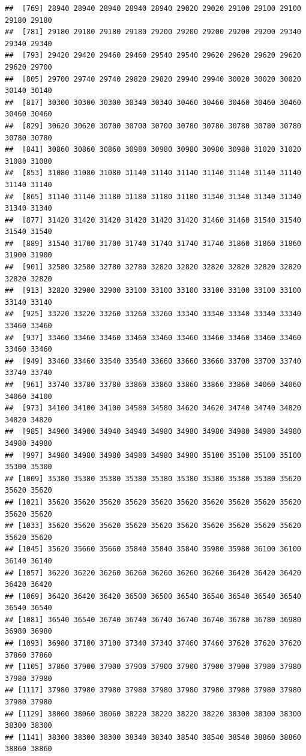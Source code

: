 \documentclass[
  12pt,
]{article}
\begin{document}
\begin{verbatim}
##  [769] 28940 28940 28940 28940 28940 29020 29020 29100 29100 29100 29180 29180
##  [781] 29180 29180 29180 29180 29200 29200 29200 29200 29200 29340 29340 29340
##  [793] 29420 29420 29460 29460 29540 29540 29620 29620 29620 29620 29620 29700
##  [805] 29700 29740 29740 29820 29820 29940 29940 30020 30020 30020 30140 30140
##  [817] 30300 30300 30300 30340 30340 30460 30460 30460 30460 30460 30460 30460
##  [829] 30620 30620 30700 30700 30700 30780 30780 30780 30780 30780 30780 30780
##  [841] 30860 30860 30860 30980 30980 30980 30980 30980 31020 31020 31080 31080
##  [853] 31080 31080 31080 31140 31140 31140 31140 31140 31140 31140 31140 31140
##  [865] 31140 31140 31180 31180 31180 31180 31340 31340 31340 31340 31340 31340
##  [877] 31420 31420 31420 31420 31420 31420 31460 31460 31540 31540 31540 31540
##  [889] 31540 31700 31700 31740 31740 31740 31740 31860 31860 31860 31900 31900
##  [901] 32580 32580 32780 32780 32820 32820 32820 32820 32820 32820 32820 32820
##  [913] 32820 32900 32900 33100 33100 33100 33100 33100 33100 33100 33140 33140
##  [925] 33220 33220 33260 33260 33260 33340 33340 33340 33340 33340 33460 33460
##  [937] 33460 33460 33460 33460 33460 33460 33460 33460 33460 33460 33460 33460
##  [949] 33460 33460 33540 33540 33660 33660 33660 33700 33700 33740 33740 33740
##  [961] 33740 33780 33780 33860 33860 33860 33860 33860 34060 34060 34060 34100
##  [973] 34100 34100 34100 34580 34580 34620 34620 34740 34740 34820 34820 34820
##  [985] 34900 34900 34940 34940 34980 34980 34980 34980 34980 34980 34980 34980
##  [997] 34980 34980 34980 34980 34980 34980 35100 35100 35100 35100 35300 35300
## [1009] 35380 35380 35380 35380 35380 35380 35380 35380 35380 35620 35620 35620
## [1021] 35620 35620 35620 35620 35620 35620 35620 35620 35620 35620 35620 35620
## [1033] 35620 35620 35620 35620 35620 35620 35620 35620 35620 35620 35620 35620
## [1045] 35620 35660 35660 35840 35840 35840 35980 35980 36100 36100 36140 36140
## [1057] 36220 36220 36260 36260 36260 36260 36260 36420 36420 36420 36420 36420
## [1069] 36420 36420 36420 36500 36500 36540 36540 36540 36540 36540 36540 36540
## [1081] 36540 36540 36740 36740 36740 36740 36740 36780 36780 36980 36980 36980
## [1093] 36980 37100 37100 37340 37340 37460 37460 37620 37620 37620 37860 37860
## [1105] 37860 37900 37900 37900 37900 37900 37900 37900 37980 37980 37980 37980
## [1117] 37980 37980 37980 37980 37980 37980 37980 37980 37980 37980 37980 37980
## [1129] 38060 38060 38060 38220 38220 38220 38220 38300 38300 38300 38300 38300
## [1141] 38300 38300 38300 38340 38340 38540 38540 38540 38860 38860 38860 38860

\end{verbatim}
\end{document}
